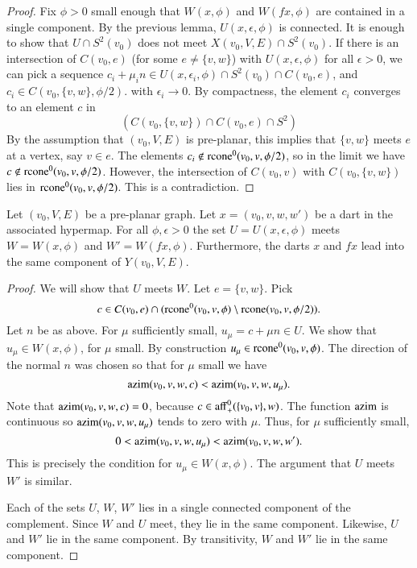 \begin{proof}  Fix $\phi>0$ small enough that $W(x,\phi)$
and $W(f x,\phi)$ are contained in a single component.
By the previous lemma, $U(x,\epsilon,\phi)$ 
is connected.  It is enough to
show that $U\cap S^2(v_0)$  does not meet $X(v_0,V,E) \cap S^2(v_0)$.
If there is an
intersection of $C(v_0,e)$ (for some $e\ne\{v,w\}$)
with $U(x,\epsilon,\phi)$ for all $\epsilon > 0$, we can pick
a sequence $c_i + \mu_i n \in U(x,\epsilon_i,\phi)\cap S^2(v_0)
\cap C(v_0,e)$, and $c_i\in C(v_0,\{v,w\},\phi/2)$. 
with $\epsilon_i \to 0$.  By compactness,
the element $c_i$ converges to an
element $c$ in 
  $$(C(v_0,\{v,w\})\cap C(v_0,e)\cap S^2)
  $$
By the assumption that  $(v_0,V,E)$ is pre-planar, this
implies that $\{v,w\}$ meets $e$ at a vertex, say $v\in e$.
The elements $c_i\not\in {\operatorname{rcone}}^0(v_0,v,\phi/2)$, so
in the limit we have $c\not\in{\operatorname{rcone}}^0(v_0,v,\phi/2)$.
However, the intersection of $C(v_0,v)$ with $C(v_0,\{v,w\})$
lies in ${\operatorname{rcone}}^0(v_0,v,\phi/2)$.  This is a contradiction.
\end{proof}

\begin{lemma}
Let $(v_0,V,E)$ be a pre-planar graph.
Let $x=(v_0,v,w,w')$ be a dart in the associated hypermap.
For all $\phi,\epsilon > 0$
the set $U=U(x,\epsilon,\phi)$ meets $W=W(x,\phi)$ and 
$W'=W(f x,\phi)$.
Furthermore, the darts $x$ and $f x$ lead into the same
component of $Y(v_0,V,E)$.
\end{lemma}

\begin{proof}
We will show that $U$ meets $W$.    Let $e=\{v,w\}$. Pick 
 $$c\in C(v_0,e) \cap 
      ({\operatorname{rcone}}^0(v_0,v,\phi)\setminus {\operatorname{rcone}}(v_0,v,\phi/2)).
 $$
Let $n$ be as above.  For $\mu$ sufficiently small,
$u_\mu=c + \mu n\in U$.  We show that $u_\mu\in W(x,\phi)$, for $\mu$ small.
By construction $u_\mu\in {\operatorname{rcone}}^0(v_0,v,\phi)$.
The direction of the normal $n$ was chosen so that for $\mu$ small
we have
   $$
   {\operatorname{azim}}(v_0,v,w,c) < {\operatorname{azim}}(v_0,v,w,u_\mu).
   $$
Note that ${\operatorname{azim}}(v_0,v,w,c) = 0$, because 
$c\in{\operatorname{aff}}_+^0(\{v_0,v\},w)$. %
The function ${\operatorname{azim}}$ is continuous %
so ${\operatorname{azim}}(v_0,v,w,u_\mu)$ tends to zero with $\mu$.
Thus, for $\mu$ sufficiently small,
   $$
   0 < {\operatorname{azim}}(v_0,v,w,u_\mu) < {\operatorname{azim}}(v_0,v,w,w').
   $$
This is precisely the condition for $u_\mu\in W(x,\phi)$.
The argument that $U$ meets
$W'$ is similar.

Each of the sets $U$, $W$, $W'$ lies in a single connected
component of the complement.  Since $W$ and $U$ meet, they
lie in the same component.  Likewise, $U$ and $W'$ lie in the
same component.  By transitivity, $W$ and $W'$ lie in the same
component.
\end{proof}

